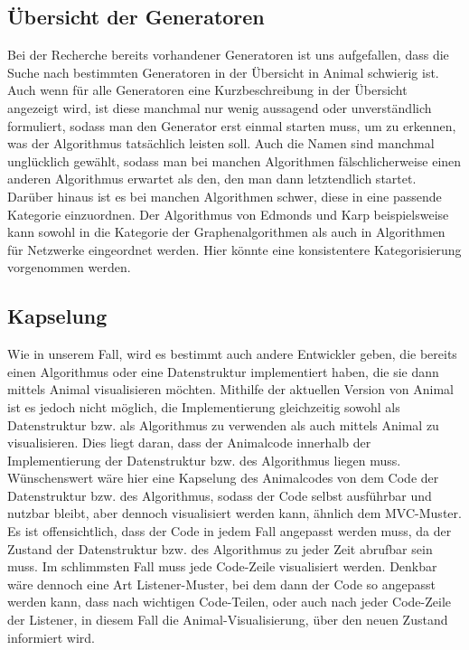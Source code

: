 \documentclass[nochapname]{tudexercise}
\begin{document}
		\subsection{Übersicht der Generatoren} \label{ss:generatorOverview}
			Bei der Recherche bereits vorhandener Generatoren ist uns aufgefallen, dass die Suche nach bestimmten Generatoren in der Übersicht in Animal schwierig ist. Auch wenn für alle Generatoren eine Kurzbeschreibung in der Übersicht angezeigt wird, ist diese manchmal nur wenig aussagend oder unverständlich formuliert, sodass man den Generator erst einmal starten muss, um zu erkennen, was der Algorithmus tatsächlich leisten soll. Auch die Namen sind manchmal unglücklich gewählt, sodass man bei manchen Algorithmen fälschlicherweise einen anderen Algorithmus erwartet als den, den man dann letztendlich startet.\\
			Darüber hinaus ist es bei manchen Algorithmen schwer, diese in eine passende Kategorie einzuordnen. Der Algorithmus von Edmonds und Karp beispielsweise kann sowohl in die Kategorie der Graphenalgorithmen als auch in Algorithmen für Netzwerke eingeordnet werden. Hier könnte eine konsistentere Kategorisierung vorgenommen werden.
		
		\subsection{Kapselung}
			Wie in unserem Fall, wird es bestimmt auch andere Entwickler geben, die bereits einen Algorithmus oder eine Datenstruktur implementiert haben, die sie dann mittels Animal visualisieren möchten. Mithilfe der aktuellen Version von Animal ist es jedoch nicht möglich, die Implementierung gleichzeitig sowohl als Datenstruktur bzw. als Algorithmus zu verwenden als auch mittels Animal zu visualisieren. Dies liegt daran, dass der Animalcode innerhalb der Implementierung der Datenstruktur bzw. des Algorithmus liegen muss.\\
			Wünschenswert wäre hier eine Kapselung des Animalcodes von dem Code der Datenstruktur bzw. des Algorithmus, sodass der Code selbst ausführbar und nutzbar bleibt, aber dennoch visualisiert werden kann, ähnlich dem MVC-Muster. Es ist offensichtlich, dass der Code in jedem Fall angepasst werden muss, da der Zustand der Datenstruktur bzw. des Algorithmus zu jeder Zeit abrufbar sein muss. Im schlimmsten Fall muss jede Code-Zeile visualisiert werden. Denkbar wäre dennoch eine Art Listener-Muster, bei dem dann der Code so angepasst werden kann, dass nach wichtigen Code-Teilen, oder auch nach jeder Code-Zeile der Listener, in diesem Fall die Animal-Visualisierung, über den neuen Zustand informiert wird.
			
\end{document}
